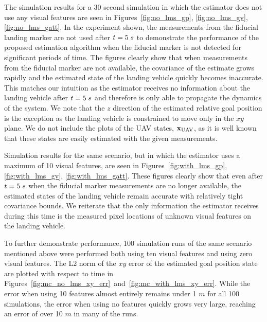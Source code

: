 The simulation results for a 30 second simulation in which the estimator does
not use any visual features are seen in
Figures~\ref{fig:no_lms_gp}, \ref{fig:no_lms_gv}, \ref{fig:no_lms_gatt}. In the
experiment shown, the measurements from the fiducial landing marker are not used
after $t = 5 \hphantom{\cdot} s$ to demonstrate the performance of the proposed
estimation algorithm when the fiducial marker is not detected for significant
periods of time. The figures clearly show that when measurements from the
fiducial marker are not available, the covariance of the estimate grows rapidly
and the estimated state of the landing vehicle quickly becomes inaccurate. This
matches our intuition as the estimator receives no information about the landing
vehicle after $t = 5 \hphantom{\cdot} s$ and therefore is only able to propagate
the dynamics of the system. We note that the $z$ direction of the estimated
relative goal position is the exception as the landing vehicle is constrained to
move only in the $xy$ plane. We do not include the plots of the UAV states,
$\boldsymbol{\mathrm{x}}_{\text{UAV}}$, as it is well known that these states are easily
estimated with the given measurements.

Simulation results for the same scenario, but in which the estimator uses a
maximum of 10 visual features, are seen in
Figures~\ref{fig:with_lms_gp}, \ref{fig:with_lms_gv}, \ref{fig:with_lms_gatt}.
These figures clearly show that even after $t = 5 \hphantom{\cdot} s$ when the
fiducial marker measurements are no longer available, the estimated states of
the landing vehicle remain accurate with relatively tight covariance bounds. We
reiterate that the only information the estimator receives during this time is
the measured pixel locations of unknown visual features on the landing vehicle.

To further demonstrate performance, 100 simulation runs of the same scenario
mentioned above were performed
both using ten visual features and using zero visual features. The L2 norm of
the $xy$ error of the estimated goal position state are plotted
with respect to time in
Figures~\ref{fig:mc_no_lms_xy_err}~and~\ref{fig:mc_with_lms_xy_err}. While the
error when using 10 features
almost entirely remains under 1 $m$ for all 100 simulations, the error when using
no features quickly grows very large, reaching an error of over 10 $m$ in many
of the runs.



